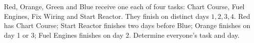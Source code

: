 Red, Orange, Green and Blue receive one each of four tasks: Chart Course, Fuel Engines, Fix Wiring and Start Reactor. They finish on distinct days $1,2,3,4$. Red has Chart Course; Start Reactor finishes two days before Blue; Orange finishes on day 1 or 3; Fuel Engines finishes on day 2. Determine everyone's task and day.

